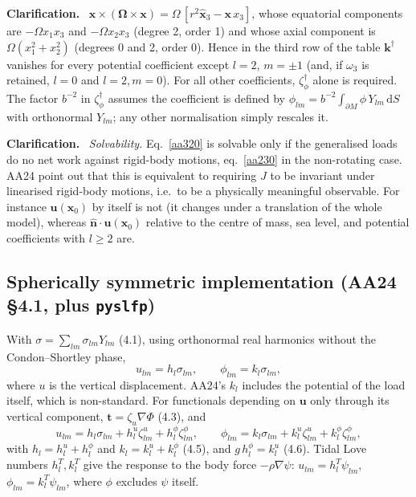 \documentclass[11pt,a4paper]{article}
\newcommand{\bO}{\bm{\Omega}}
\newcommand{\bx}{\mathbf{x}}
\newcommand{\bu}{\mathbf{u}}
\newcommand{\bt}{\mathbf{t}}
\newcommand{\bk}{\mathbf{k}}
\newcommand{\bn}{\hat{\mathbf{n}}}
\newcommand{\dd}{\,\mathrm{d}}
\newcommand{\pM}{\partial M}
\renewenvironment{leftbar}{%
  \def\FrameCommand{{\color{clarbar}\vrule width 2.5pt}\hspace{8pt}}%
  \MakeFramed{\advance\hsize-\width\FrameRestore}}%
  {\endMakeFramed}
\newenvironment{clar}{\begin{leftbar}\small\noindent\textbf{Clarification.}\ }{\end{leftbar}}
\begin{document}
\begin{clar}
$\bx\times(\bO\times\bx)=\Omega\,[r^2\hat{\mathbf{x}}_3-\bx\,x_3]$, whose equatorial components are
$-\Omega x_1x_3$ and $-\Omega x_2x_3$ (degree 2, order 1) and whose axial component is
$\Omega(x_1^2+x_2^2)$ (degrees 0 and 2, order 0). Hence in the third row of the table $\bk^\dagger$
vanishes for every potential coefficient except $l=2$, $m=\pm1$ (and, if $\omega_3$ is retained,
$l=0$ and $l=2,m=0$). For all other coefficients, $\zeta^\dagger_\phi$ alone is required. The factor
$b^{-2}$ in $\zeta^\dagger_\phi$ assumes the coefficient is defined by
$\phi_{lm}=b^{-2}\int_{\pM}\phi\,Y_{lm}\dd S$ with orthonormal $Y_{lm}$; any other normalisation
simply rescales it.
\end{clar}

\begin{clar}
\emph{Solvability.} Eq.~\eqref{aa320} is solvable only if the generalised loads do no net work
against rigid-body motions, eq.~\eqref{aa230} in the non-rotating case. AA24 point out that this is
equivalent to requiring $J$ to be invariant under linearised rigid-body motions, i.e.\ to be a
physically meaningful observable. For instance $\bu(\bx_0)$ by itself is not (it changes under a
translation of the whole model), whereas $\bn\cdot\bu(\bx_0)$ relative to the centre of mass, sea
level, and potential coefficients with $l\ge2$ are.
\end{clar}

\subsection{Spherically symmetric implementation (AA24 \S4.1, plus \texttt{pyslfp})}
\label{sec:spectral}

With $\sigma=\sum_{lm}\sigma_{lm}Y_{lm}$ (4.1), using orthonormal real harmonics without the
Condon--Shortley phase,
\begin{equation}
  u_{lm}=h_l\sigma_{lm},\qquad\phi_{lm}=k_l\sigma_{lm},
  \tag{4.2}
\end{equation}
where $u$ is the vertical displacement. AA24's $k_l$ includes the potential of the load itself,
which is non-standard. For functionals depending on $\bu$ only through its vertical component,
$\bt=\zeta_u\nabla\Phi$ (4.3), and
\begin{equation}
  u_{lm}=h_l\sigma_{lm}+h^u_l\zeta^u_{lm}+h^\phi_l\zeta^\phi_{lm},\qquad
  \phi_{lm}=k_l\sigma_{lm}+k^u_l\zeta^u_{lm}+k^\phi_l\zeta^\phi_{lm},
  \tag{4.4}
\end{equation}
with $h_l=h_l^u+h_l^\phi$ and $k_l=k_l^u+k_l^\phi$ (4.5), and $g\,h^\phi_l=k^u_l$ (4.6).
Tidal Love numbers $h^T_l,k^T_l$ give the response to the body force $-\rho\nabla\psi$:
$u_{lm}=h^T_l\psi_{lm}$, $\phi_{lm}=k^T_l\psi_{lm}$, where $\phi$ excludes $\psi$ itself.
\end{document}
